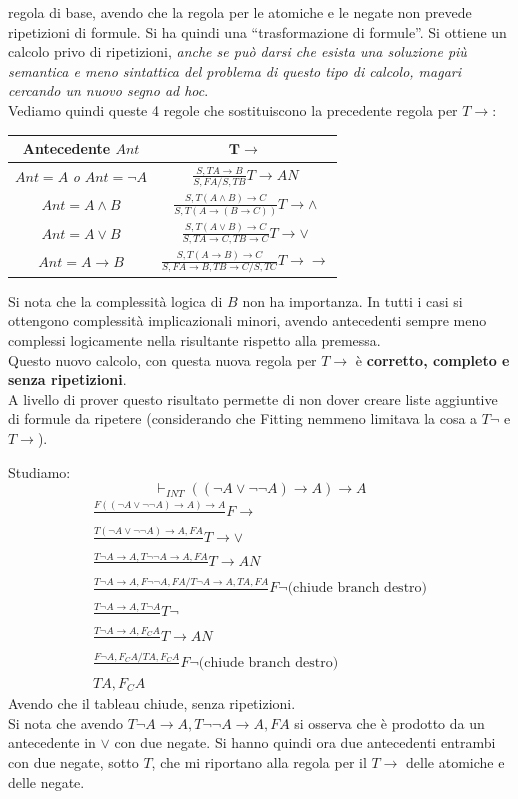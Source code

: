 \documentclass[a4paper,12pt, oneside]{book}
\begin{document}
regola di base, avendo che la regola per le atomiche e le negate non prevede
ripetizioni di formule. Si ha quindi una ``trasformazione di formule''. Si
ottiene un calcolo privo di ripetizioni,\textit{ anche se può darsi che esista
  una soluzione più semantica e meno sintattica del problema di questo tipo di
  calcolo, magari cercando un nuovo segno ad hoc}. \\
Vediamo quindi queste 4 regole che sostituiscono la precedente regola per
$T\to$: 
\begin{table}[H]
  \Large
  \centering
  \begin{tabular}{c|c}
     Antecedente $Ant$ & $\mathbf{T\to}$\\
    \hline
    $Ant=A$ \textit{o} $Ant=\neg A$ & $\frac{S,TA\to B}{S,FA/S,TB}T\to AN$\\
    \hline
    $Ant=A\land B $ & $\frac{S,T(A\land B)\to C}{S,T(A\to(B\to C))}T\to \land$\\
    \hline
    $Ant=A\lor B$ & $\frac{S,T(A\lor B)\to C}{S,TA\to C, TB\to C}T\to \lor$\\
    \hline
    $Ant =A\to B$ & $\frac{S,T(A\to B)\to C}{S, FA\to B, TB\to C/S, TC}T\to \to$\\
    \hline
  \end{tabular}
\end{table}
Si nota che la complessità logica di $B$ non ha importanza. In tutti i casi si
ottengono complessità implicazionali minori, avendo antecedenti sempre meno
complessi logicamente nella risultante rispetto alla premessa.\\
Questo nuovo calcolo, con questa nuova regola per $T\to$ è \textbf{corretto,
  completo e senza ripetizioni}.\\
A livello di prover questo risultato permette di non dover creare liste
aggiuntive di formule da ripetere (considerando che Fitting nemmeno limitava la
cosa a $T\neg $ e $T\to$).
\begin{esempio}
  Studiamo:
  \[\vdash_{INT} ((\neg A\lor \neg \neg A)\to A)\to A\]
  \begin{gather*}
    \frac{F ((\neg A\lor \neg \neg A)\to A)\to A}{}F\to\\
    \frac{T(\neg A\lor \neg \neg A)\to A, FA}{}T\to\lor\\ 
    \frac{T\neg A\to A, T\neg\neg A\to A,FA}{}T\to AN\\
    \frac{T\neg A\to A, F\neg\neg A, FA/T\neg A\to A, TA,FA}{}F\neg\mbox{(chiude
      branch destro)}\\ 
    \frac{T\neg A\to A,T\neg A}{}T\neg\\
    \frac{T\neg A\to A,F_C A}{}T\to AN\\
    \frac{F\neg A, F_CA/TA,F_CA}{}F\neg\mbox{(chiude branch destro)}\\
    TA, F_CA
  \end{gather*}
  Avendo che il tableau chiude, senza ripetizioni.\\
  Si nota che avendo $T\neg A\to A, T\neg\neg A\to A,FA$ si osserva che è
  prodotto da un antecedente in $\lor$ con due negate. Si hanno quindi ora due
  antecedenti entrambi con due negate, sotto $T$, che mi riportano alla regola
  per il $T\to$ delle atomiche e delle negate.
\end{esempio}
\end{document}
